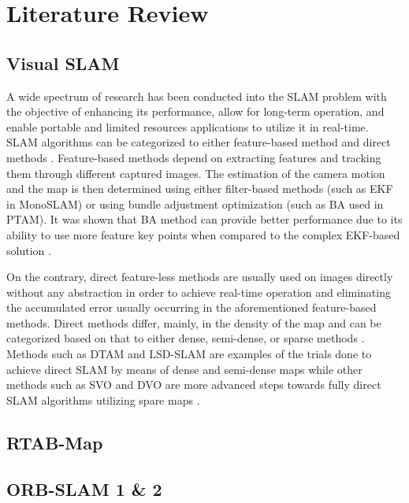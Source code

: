\documentclass[12pt]{article}
\begin{document}
\section{Literature Review}
\subsection{Visual SLAM}
\indent A wide spectrum of research has been conducted into the SLAM problem with the objective of enhancing its performance, allow for long-term operation, and enable portable and limited resources applications to utilize it in real-time. SLAM algorithms can be categorized to either feature-based method and direct methods \cite{taketomi2017visual}. Feature-based methods depend on extracting features and tracking them through different captured images. The estimation of the camera motion and the map is then determined using either filter-based methods (such as EKF in MonoSLAM) or using bundle adjustment optimization (such as BA used in PTAM). It was shown that BA method can provide better performance due to its ability to use more feature key points when compared to the complex EKF-based solution \cite{strasdat2012visual}. 

On the contrary, direct feature-less methods are usually used on images directly without any abstraction \cite{taketomi2017visual} in order to achieve real-time operation and eliminating the accumulated error usually occurring in the aforementioned feature-based methods. Direct methods differ, mainly, in the density of the map and can be categorized based on that to either dense, semi-dense, or sparse methods \cite{taketomi2017visual}. Methods such as DTAM and LSD-SLAM are examples of the trials done to achieve direct SLAM by means of dense and semi-dense maps while other methods such as SVO and DVO are more advanced steps towards fully direct SLAM algorithms utilizing spare maps \cite{cadena2016past}\cite{taketomi2017visual}.
\subsection{RTAB-Map}
\subsection{ORB-SLAM 1 \& 2}
\end{document}
